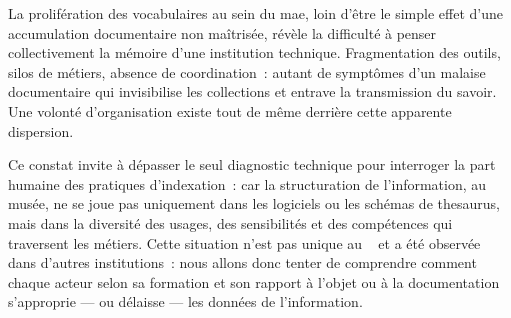 La prolifération des vocabulaires au sein du \acf{mae}, loin d’être le simple effet d’une accumulation documentaire non maîtrisée, révèle la difficulté à penser collectivement la mémoire d’une institution technique. Fragmentation des outils, silos de métiers, absence de coordination~: autant de symptômes d’un malaise documentaire qui invisibilise les collections et entrave la transmission du savoir. Une volonté d'organisation existe tout de même derrière cette apparente dispersion.



\bigskip



Ce constat invite à dépasser le seul diagnostic technique pour interroger la part humaine des pratiques d’indexation~: car la structuration de l’information, au musée, ne se joue pas uniquement dans les logiciels ou les schémas de \gls{thesaurus}, mais dans la diversité des usages, des sensibilités et des compétences qui traversent les métiers. Cette situation n'est pas unique au \mae~ et a été observée dans d'autres institutions~: nous allons donc tenter de comprendre comment chaque acteur selon sa formation et son rapport à l’objet ou à la documentation s’approprie — ou délaisse — les données de l'information.